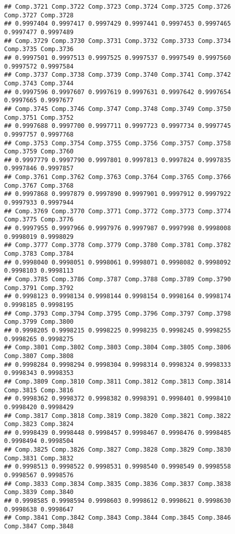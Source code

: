 \documentclass[
]{article}
\begin{document}
\begin{verbatim}
## Comp.3721 Comp.3722 Comp.3723 Comp.3724 Comp.3725 Comp.3726 Comp.3727 Comp.3728 
## 0.9997404 0.9997417 0.9997429 0.9997441 0.9997453 0.9997465 0.9997477 0.9997489 
## Comp.3729 Comp.3730 Comp.3731 Comp.3732 Comp.3733 Comp.3734 Comp.3735 Comp.3736 
## 0.9997501 0.9997513 0.9997525 0.9997537 0.9997549 0.9997560 0.9997572 0.9997584 
## Comp.3737 Comp.3738 Comp.3739 Comp.3740 Comp.3741 Comp.3742 Comp.3743 Comp.3744 
## 0.9997596 0.9997607 0.9997619 0.9997631 0.9997642 0.9997654 0.9997665 0.9997677 
## Comp.3745 Comp.3746 Comp.3747 Comp.3748 Comp.3749 Comp.3750 Comp.3751 Comp.3752 
## 0.9997688 0.9997700 0.9997711 0.9997723 0.9997734 0.9997745 0.9997757 0.9997768 
## Comp.3753 Comp.3754 Comp.3755 Comp.3756 Comp.3757 Comp.3758 Comp.3759 Comp.3760 
## 0.9997779 0.9997790 0.9997801 0.9997813 0.9997824 0.9997835 0.9997846 0.9997857 
## Comp.3761 Comp.3762 Comp.3763 Comp.3764 Comp.3765 Comp.3766 Comp.3767 Comp.3768 
## 0.9997868 0.9997879 0.9997890 0.9997901 0.9997912 0.9997922 0.9997933 0.9997944 
## Comp.3769 Comp.3770 Comp.3771 Comp.3772 Comp.3773 Comp.3774 Comp.3775 Comp.3776 
## 0.9997955 0.9997966 0.9997976 0.9997987 0.9997998 0.9998008 0.9998019 0.9998029 
## Comp.3777 Comp.3778 Comp.3779 Comp.3780 Comp.3781 Comp.3782 Comp.3783 Comp.3784 
## 0.9998040 0.9998051 0.9998061 0.9998071 0.9998082 0.9998092 0.9998103 0.9998113 
## Comp.3785 Comp.3786 Comp.3787 Comp.3788 Comp.3789 Comp.3790 Comp.3791 Comp.3792 
## 0.9998123 0.9998134 0.9998144 0.9998154 0.9998164 0.9998174 0.9998185 0.9998195 
## Comp.3793 Comp.3794 Comp.3795 Comp.3796 Comp.3797 Comp.3798 Comp.3799 Comp.3800 
## 0.9998205 0.9998215 0.9998225 0.9998235 0.9998245 0.9998255 0.9998265 0.9998275 
## Comp.3801 Comp.3802 Comp.3803 Comp.3804 Comp.3805 Comp.3806 Comp.3807 Comp.3808 
## 0.9998284 0.9998294 0.9998304 0.9998314 0.9998324 0.9998333 0.9998343 0.9998353 
## Comp.3809 Comp.3810 Comp.3811 Comp.3812 Comp.3813 Comp.3814 Comp.3815 Comp.3816 
## 0.9998362 0.9998372 0.9998382 0.9998391 0.9998401 0.9998410 0.9998420 0.9998429 
## Comp.3817 Comp.3818 Comp.3819 Comp.3820 Comp.3821 Comp.3822 Comp.3823 Comp.3824 
## 0.9998439 0.9998448 0.9998457 0.9998467 0.9998476 0.9998485 0.9998494 0.9998504 
## Comp.3825 Comp.3826 Comp.3827 Comp.3828 Comp.3829 Comp.3830 Comp.3831 Comp.3832 
## 0.9998513 0.9998522 0.9998531 0.9998540 0.9998549 0.9998558 0.9998567 0.9998576 
## Comp.3833 Comp.3834 Comp.3835 Comp.3836 Comp.3837 Comp.3838 Comp.3839 Comp.3840 
## 0.9998585 0.9998594 0.9998603 0.9998612 0.9998621 0.9998630 0.9998638 0.9998647 
## Comp.3841 Comp.3842 Comp.3843 Comp.3844 Comp.3845 Comp.3846 Comp.3847 Comp.3848 

\end{verbatim}
\end{document}
